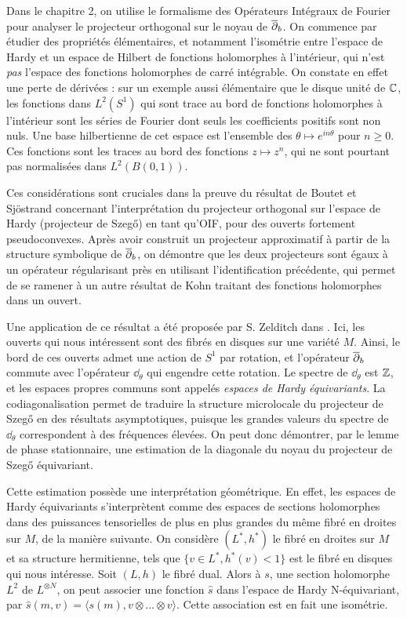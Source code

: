 Dans le chapitre 2, on utilise le formalisme des Opérateurs Intégraux de Fourier pour analyser le projecteur orthogonal sur le noyau de $\overline{\partial}_b$. On commence par étudier des propriétés élémentaires, et notamment l'isométrie entre l'espace de Hardy et un espace de Hilbert de fonctions holomorphes à l'intérieur, qui n'est \emph{pas} l'espace des fonctions holomorphes de carré intégrable. On constate en effet une perte de dérivées : sur un exemple aussi élémentaire que le disque unité de $\mathbb{C}$, les fonctions dans $L^2(S^1)$ qui sont trace au bord de fonctions holomorphes à l'intérieur sont les séries de Fourier dont seuls les coefficients positifs sont non nuls. Une base hilbertienne de cet espace est l'ensemble des $\theta \mapsto e^{in\theta}$ pour $n\geq 0$. Ces fonctions sont les traces au bord des fonctions $z\mapsto z^n$, qui ne sont pourtant pas normalisées dans $L^2(B(0,1))$. 

Ces considérations sont cruciales dans la preuve du résultat de Boutet
et Sj\"ostrand concernant l'interprétation du projecteur orthogonal
sur l'espace de Hardy (projecteur de Szeg\H{o}) en tant qu'OIF, pour
des ouverts fortement pseudoconvexes. Après avoir construit un projecteur approximatif à partir de la structure symbolique de $\overline{\partial}_b$, on démontre que les deux projecteurs sont égaux à un opérateur régularisant près en utilisant l'identification précédente, qui permet de se ramener à un autre résultat de Kohn traitant des fonctions holomorphes dans un ouvert.

Une application de ce résultat a été proposée par S. Zelditch dans \cite{Zelditch2000}. Ici, les ouverts qui nous intéressent sont des fibrés en disques sur une variété $M$. Ainsi, le bord de ces ouverts admet une action de $S^1$ par rotation, et l'opérateur $\overline{\partial}_b$ commute avec l'opérateur $\dd_{\theta}$ qui engendre cette rotation. Le spectre de $\dd_{\theta}$ est $\mathbb{Z}$, et les espaces propres communs sont appelés \emph{espaces de Hardy équivariants}. La codiagonalisation permet de traduire la structure microlocale du projecteur de Szeg\H{o} en des résultats asymptotiques, puisque les grandes valeurs du spectre de $\dd_{\theta}$ correspondent à des fréquences élevées. On peut donc démontrer, par le lemme de phase stationnaire, une estimation de la diagonale du noyau du projecteur de Szeg\H{o} équivariant. 

Cette estimation possède une interprétation géométrique. En effet, les
espaces de Hardy équivariants s'interprètent comme des espaces de
sections holomorphes dans des puissances tensorielles de plus en plus
grandes du même fibré en droites sur $M$, de la manière suivante. On
considère $(L^*,h^*)$ le fibré en droites sur $M$ et sa structure
hermitienne, tels que $\{v \in
L^*, h^*(v)< 1\}$ est le fibré en disques qui nous intéresse. Soit
$(L,h)$ le fibré dual. Alors à $s$, une section holomorphe $L^2$ de $L^{\otimes
  N}$, on peut associer une fonction $\hat{s}$ dans l'espace de Hardy
N-équivariant, par $\hat{s}(m,v)=\langle s(m),v\otimes \ldots \otimes
v \rangle$. Cette association est en fait une isométrie.

